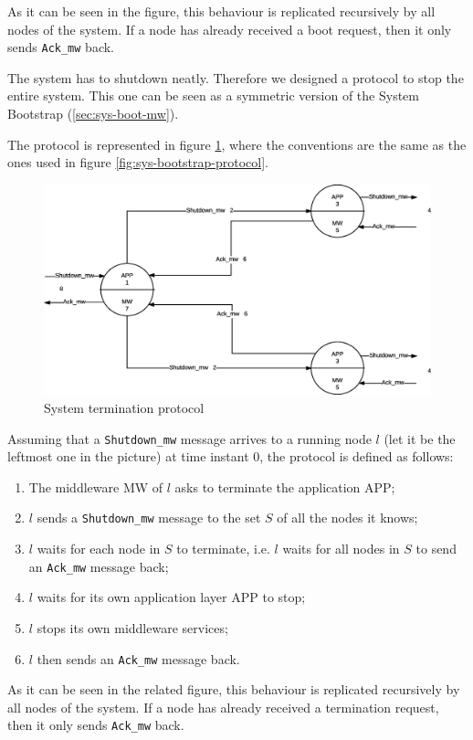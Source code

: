 As it can be seen in the figure, this behaviour is replicated recursively
by all nodes of the system. If a node has already received a boot request,
then it only sends \texttt{Ack\_mw} back.


The system has to shutdown neatly. Therefore we designed a protocol to
stop the entire system. This one can be seen as a
symmetric version of the System Bootstrap (\ref{sec:sys-boot-mw}).

The protocol is represented in figure \ref{fig:sys-termination-protocol}, where
the conventions are the same as the ones used in figure
\ref{fig:sys-bootstrap-protocol}.

\begin{figure}[H]
  \centering
  \includegraphics[width=\columnwidth]{images/solution/termination.eps}
  \caption{System termination protocol}
  \label{fig:sys-termination-protocol}
\end{figure}

Assuming that a \texttt{Shutdown\_mw} message arrives to a running node
$l$ (let it be the leftmost one in the picture) at time instant $0$, the
protocol is defined as follows:

\begin{enumerate}
\item The middleware MW of $l$ asks to terminate the application APP;
\item $l$ sends a \texttt{Shutdown\_mw} message to the set
  $S$ of all the nodes it knows;
\item $l$ waits for each node in $S$ to terminate, i.e. $l$ waits for all
  nodes in $S$ to send an \texttt{Ack\_mw} message back;
\item $l$ waits for its own application layer APP to stop;
\item $l$ stops its own middleware services;
\item $l$ then sends an \texttt{Ack\_mw} message back.
\end{enumerate}

As it can be seen in the related figure, this behaviour is replicated
recursively by all nodes of the system. If a node has already received a
termination request, then it only sends \texttt{Ack\_mw} back.
